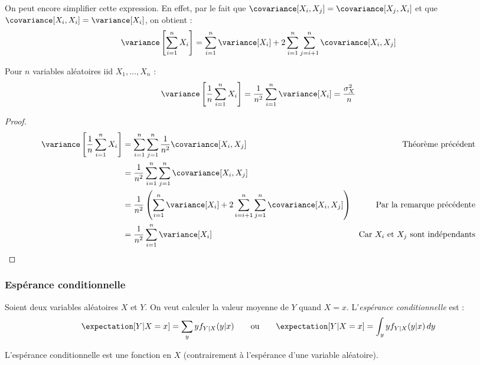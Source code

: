     \begin{remarque}
        On peut encore simplifier cette expression. En effet, par le fait que \(\covariance[X_i, X_j] = \covariance[X_j, X_i]\) et que \(\covariance[X_i, X_i] = \variance[X_i]\), on obtient :
        \[
            \variance\left[\sum_{i=1}^n X_i\right] = \sum_{i=1}^n \variance[X_i] + 2\sum_{i=1}^n \sum_{j=i+1}^n \covariance[X_i, X_j]
        \]
    \end{remarque}

    \begin{theorem}
        Pour \(n\) variables aléatoires iid \(X_1, \dots, X_n\) :
        \[
            \variance\left[\frac{1}{n} \sum_{i=1}^n X_i\right] = \frac{1}{n^2} \sum_{i=1}^n \variance[X_i] = \frac{\sigma_X^2}{n}
        \]
    \end{theorem}
    \begin{proof}
        \begin{align*}
            \variance\left[\frac{1}{n} \sum_{i=1}^n X_i\right] &= \sum_{i=1}^n \sum_{j=1}^n \frac{1}{n^2} \covariance[X_i, X_j] & \text{Théorème précédent}\\
            &= \frac{1}{n^2} \sum_{i=1}^n \sum_{j=1}^n \covariance[X_i, X_j]\\
            &= \frac{1}{n^2} \left(\sum_{i=1}^n \variance[X_i] + 2\sum_{i=i+1}^n\sum_{j=1}^n \covariance[X_i, X_j]\right) & \text{Par la remarque précédente}\\
            &= \frac{1}{n^2} \sum_{i=1}^n \variance[X_i] & \text{Car \(X_i\) et \(X_j\) sont indépendants}
        \end{align*}
    \end{proof}

    \subsubsection{Espérance conditionnelle}
        \begin{definition}
            Soient deux variables aléatoires \(X\) et \(Y\). On veut calculer la valeur moyenne de \(Y\) quand \(X = x\). L'\textit{espérance conditionnelle} est :
            \[
                \expectation[Y | X = x] = \sum_y y f_{Y|X}(y | x) \text{\hspace{2em}ou\hspace{2em}} \expectation[Y | X = x] = \int_y y f_{Y|X}(y|x)\,dy
            \]

            L'espérance conditionnelle est une fonction en \(X\) (contrairement à l'espérance d'une variable aléatoire).
        \end{definition}

